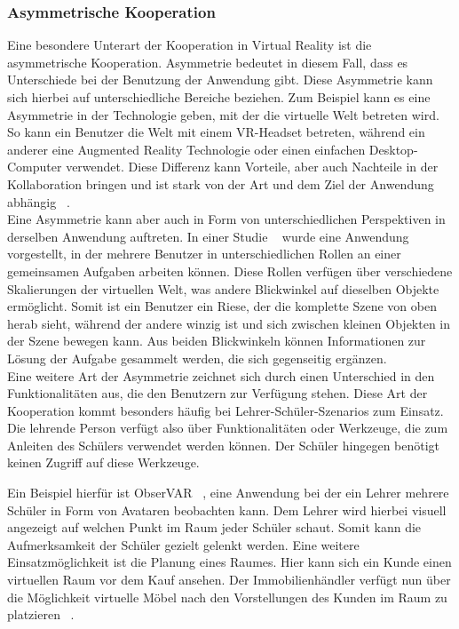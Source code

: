 \subsubsection{Asymmetrische Kooperation}
Eine besondere Unterart der Kooperation in Virtual Reality ist die asymmetrische Kooperation. Asymmetrie bedeutet in diesem Fall, dass es Unterschiede bei der Benutzung der Anwendung gibt. Diese Asymmetrie kann sich hierbei auf unterschiedliche Bereiche beziehen. Zum Beispiel kann es eine Asymmetrie in der Technologie geben, mit der die virtuelle Welt betreten wird. So kann ein Benutzer die Welt mit einem VR-Headset betreten, während ein anderer eine Augmented Reality Technologie oder einen einfachen Desktop-Computer verwendet. Diese Differenz kann Vorteile, aber auch Nachteile in der Kollaboration bringen und ist stark von der Art und dem Ziel der Anwendung abhängig ~\parencite{8798080}. \\

Eine Asymmetrie kann aber auch in Form von unterschiedlichen Perspektiven in derselben Anwendung auftreten. In einer Studie ~\parencite{7563562} wurde eine Anwendung vorgestellt, in der mehrere Benutzer in unterschiedlichen Rollen an einer gemeinsamen Aufgaben arbeiten können. Diese Rollen verfügen über verschiedene Skalierungen der virtuellen Welt, was andere Blickwinkel auf dieselben Objekte ermöglicht. Somit ist ein Benutzer ein Riese, der die komplette Szene von oben herab sieht, während der andere winzig ist und sich zwischen kleinen Objekten in der Szene bewegen kann. Aus beiden Blickwinkeln können Informationen zur Lösung der Aufgabe gesammelt werden, die sich gegenseitig ergänzen. \\

Eine weitere Art der Asymmetrie zeichnet sich durch einen Unterschied in den Funktionalitäten aus, die den Benutzern zur Verfügung stehen. Diese Art der Kooperation kommt besonders häufig bei Lehrer-Schüler-Szenarios zum Einsatz. Die lehrende Person verfügt also über Funktionalitäten oder Werkzeuge, die zum Anleiten des Schülers verwendet werden können. Der Schüler hingegen benötigt keinen Zugriff auf diese Werkzeuge. 

\newpage

Ein Beispiel hierfür ist ObserVAR ~\parencite{8943686}, eine Anwendung bei der ein Lehrer mehrere Schüler in Form von Avataren beobachten kann. Dem Lehrer wird hierbei visuell angezeigt auf welchen Punkt im Raum jeder Schüler schaut. Somit kann die Aufmerksamkeit der Schüler gezielt gelenkt werden. Eine weitere Einsatzmöglichkeit ist die Planung eines Raumes. Hier kann sich ein Kunde einen virtuellen Raum vor dem Kauf ansehen. Der Immobilienhändler verfügt nun über die Möglichkeit virtuelle Möbel nach den Vorstellungen des Kunden im Raum zu platzieren ~\parencite{7223433}. \\

